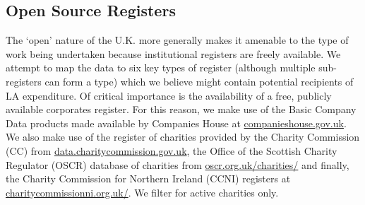 \documentclass[11pt]{article}
\begin{document}
\subsection{Open Source Registers}\label{registers}

The `open' nature of the U.K. more generally makes it amenable to the type of work being undertaken because institutional registers are freely available. We attempt to map the data to six key types of register (although multiple sub-registers can form a type) which we believe might contain potential recipients of LA expenditure. Of critical importance is the availability of a free, publicly available corporates register. For this reason, we make use of the Basic Company Data products made available by Companies House at \url{companieshouse.gov.uk}.  We also make use of the register of charities provided by the Charity Commission (CC) from \url{data.charitycommission.gov.uk}, the Office of the Scottish Charity Regulator (OSCR) database of charities from \url{oscr.org.uk/charities/} and finally, the Charity Commission for Northern Ireland (CCNI) registers at \url{charitycommissionni.org.uk/}. We filter for active charities only.
\end{document}
